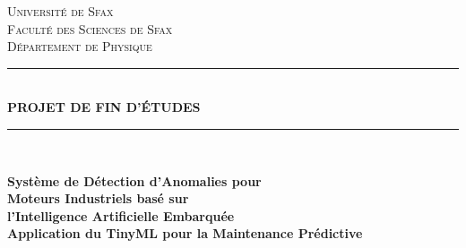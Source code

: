\documentclass[oneside, french, a4paper, 12pt, reqno]{book}
\newcommand{\HRule}[1][\linewidth]{\rule{#1}{0.5mm}}
\begin{document}
\pagestyle{pfeStyle}
\frontmatter  %

\begin{titlepage}
    \thispagestyle{empty}
    \begin{center}
        \vspace*{-2cm}
        
        \textsc{\Large Université de Sfax}\\[0.5cm]
        \textsc{\Large Faculté des Sciences de Sfax}\\[0.5cm]
        \textsc{Département de Physique}\\[1.5cm]
        
        \HRule[0.8\textwidth]\\[0.4cm]
        {\huge\bfseries PROJET DE FIN D'ÉTUDES}\\[0.2cm]
        \HRule[0.8\textwidth]\\[1.5cm]
        
        \begin{tcolorbox}[
            colback=Gris2,
            colframe=chapterColor,
            boxrule=2pt,
            arc=0mm,
            width=0.9\textwidth,
            center
        ]
            \centering
            \Large\bfseries Système de Détection d'Anomalies pour\\
            Moteurs Industriels basé sur\\
            l'Intelligence Artificielle Embarquée\\[0.5cm]
            \large Application du TinyML pour la Maintenance Prédictive
        \end{tcolorbox}
        
        \vspace{1.5cm}
        

\end{center}
\end{titlepage}
\end{document}

